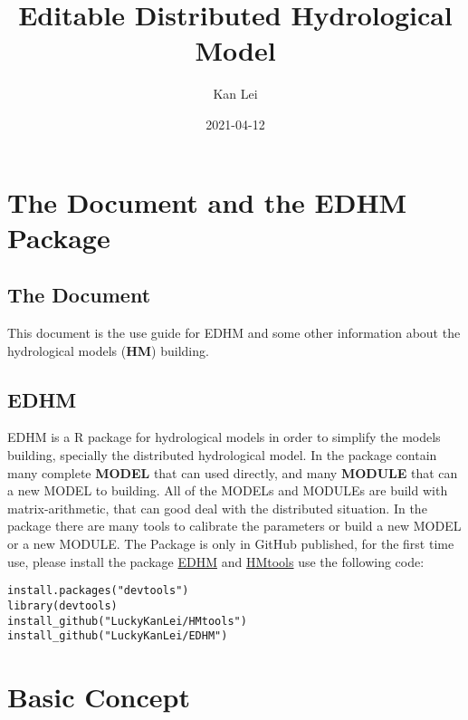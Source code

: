 \documentclass[
]{book}
\title{Editable Distributed Hydrological Model}
\author{Kan Lei}
\date{2021-04-12}
\begin{document}
\maketitle

{
\setcounter{tocdepth}{1}
\tableofcontents
}
\hypertarget{the-document-and-the-edhm-package}{%
\chapter*{The Document and the EDHM Package}\label{the-document-and-the-edhm-package}}

\hypertarget{the-document}{%
\section*{The Document}\label{the-document}}

This document is the use guide for EDHM and some other information about the hydrological models (\textbf{HM}) building.

\hypertarget{edhm}{%
\section*{EDHM}\label{edhm}}

EDHM is a R package for hydrological models in order to simplify the models building, specially the distributed hydrological model. In the package contain many complete \textbf{MODEL} that can used directly, and many \textbf{MODULE} that can a new MODEL to building. All of the MODELs and MODULEs are build with matrix-arithmetic, that can good deal with the distributed situation. In the package there are many tools to calibrate the parameters or build a new MODEL or a new MODULE. The Package is only in GitHub published, for the first time use, please install the package \href{https://github.com/LuckyKanLei/EDHM}{EDHM} and \href{https://github.com/LuckyKanLei/HMtools}{HMtools} use the following code:

\begin{verbatim}
install.packages("devtools")
library(devtools)
install_github("LuckyKanLei/HMtools")
install_github("LuckyKanLei/EDHM")
\end{verbatim}

\hypertarget{base}{%
\chapter{Basic Concept}\label{base}}
\end{document}
